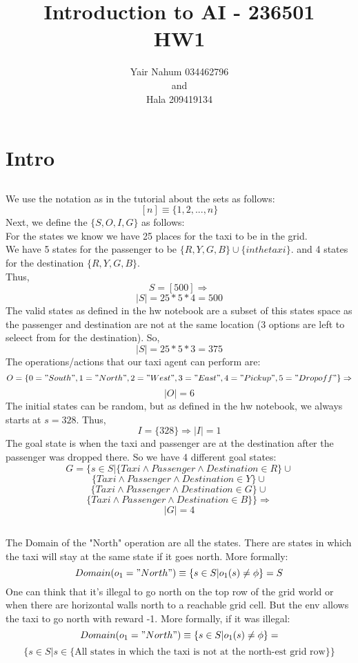 \documentclass[12pt]{article}
\title{Introduction to AI - 236501\\HW1}
\author{Yair Nahum 034462796\\and\\Hala 209419134 }
\begin{document}
\maketitle


\section{Intro}

\subsection{}
We use the notation as in the tutorial about the sets as follows:\\
$$[n] \equiv \{ 1,2,...,n\}$$
Next, we define the $\{S,O,I,G\}$ as follows:\\
For the states we know we have 25 places for the taxi to be in the grid.\\
We have 5 states for the passenger to be $\{R,Y,G,B\}\cup\{in the taxi\}$.
and 4 states for the destination $\{R,Y,G,B\}$.\\
Thus, 
$$S = [500] \Rightarrow $$
$$ |S| = 25*5*4 = 500$$
The valid states as defined in the hw notebook are a subset of this states space as the passenger and destination are not at the same location (3 options are left to seleect from for the destination). So,\\
$$ |S| = 25*5*3 = 375$$
The operations/actions that our taxi agent can perform are:\\
$$O = \{0="South",1="North",2="West",3="East",4="Pickup",5="Dropoff"\}\Rightarrow$$
$$|O| = 6$$
The initial states can be random, but as defined in the hw notebook, we always starts at $s = 328$. Thus,\\
$$I=\{328\}\Rightarrow |I|=1$$
The goal state is when the taxi and passenger are at the destination after the passenger was dropped there. So we have 4 different goal states:\\

$$G=\{s\in S | \{Taxi\wedge Passenger \wedge Destination\in R\} \cup $$
$$\{Taxi\wedge Passenger \wedge Destination\in Y\} \cup $$
$$\{Taxi\wedge Passenger \wedge Destination\in G\} \cup $$
$$\{Taxi\wedge Passenger \wedge Destination\in B\} \} \Rightarrow$$
$$|G|=4$$
\subsection{}
The Domain of the "North" operation are all the states. There are states in which the taxi will stay at the same state if it goes north.
More formally:
$$Domain(o_1="North")\equiv\{s\in S | o_1(s)\neq \phi\} = S$$
One can think that it's illegal to go north on the top row of the grid world or when  there are horizontal walls north to a reachable grid cell. But the env allows the taxi to go north with reward -1.
More formally, if it was illegal:\\
$$Domain(o_1="North")\equiv\{s\in S | o_1(s)\neq \phi\} = $$
$$\{s\in S |s\in \{\text{All states in which the taxi is not at the north-est grid row} \}\}$$
\end{document}

